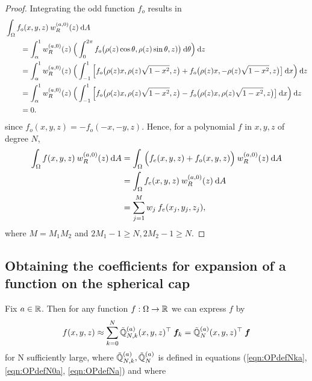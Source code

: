 \documentclass[11pt, oneside]{article}   	%
\begin{document}
\begin{proof}
Integrating the odd function $f_o$ results in
\begin{align*}
	&\int_\Omega f_o(x,y,z) \: w_R^{(a,0)}(z) \: {\rm d} A \\
	&\quad \quad = \int_\alpha^1 w_R^{(a,0)}(z) \: \Big( \int_0^{2\pi} f_o\big(\rho(z)\cos\theta,\rho(z)\sin\theta, z)\big) \: {\rm d} \theta \Big) \: {\rm d} z \\
	&\quad \quad = \int_\alpha^1 w_R^{(a,0)}(z) \: \Big( \int_{-1}^1 \Big[ f_o\big(\rho(z)x,\rho(z)\sqrt{1-x^2}, z\big) + f_o\big(\rho(z)x, - \rho(z)\sqrt{1-x^2}, z\big) \big] \: {\rm d} x \Big) \: {\rm d} z \\
	&\quad \quad = \int_\alpha^1 w_R^{(a,0)}(z) \: \Big( \int_{-1}^1 \Big[ f_o\big(\rho(z)x,\rho(z)\sqrt{1-x^2}, z\big) - f_o\big(\rho(z)x, \rho(z)\sqrt{1-x^2}, z\big) \big] \: {\rm d} x \Big) \: {\rm d} z \\
	&\quad \quad = 0.
\end{align*}
since $f_o(x,y,z) = - f_o(-x, -y, z)$. Hence, for a polynomial $f$ in $x,y,z$ of degree $N$,
\begin{align*}
	\int_\Omega f(x,y,z) \: w_R^{(a,0)}(z) \: {\rm d} A &= \int_\Omega \Big(f_e(x,y,z) + f_o(x,y,z)\Big) \:  w_R^{(a,0)}(z) \: {\rm d} A  \\
	&= \int_\Omega f_e(x,y,z) \: w_R^{(a,0)}(z) \: {\rm d} A \\
	&= \sum_{j=1}^{M}  w_j \: f_e(x_j, y_j, z_j),
\end{align*}
where $M = M_1 M_2$ and $2M_1 - 1 \ge N, 2M_2 - 1 \ge N$.
\end{proof}


\subsection{Obtaining the coefficients for expansion of a function on the spherical cap}\label{subsection:expandingfunctions}

Fix $a \in \mathbb{R}$. Then for any function $f : \Omega \to \mathbb{R}$ we can express $f$ by
\begin{align*}
	f(x,y,z) \approx \sum_{k=0}^N {\mathbb{\tilde Q}}^{(a)}_{N,k}(x,y,z)^\top \: \bm{f}_k = {\mathbb{\tilde Q}}^{(a)}_{N}(x,y,z)^\top \: \bm{f}
\end{align*}
for N sufficiently large, where ${\mathbb{\tilde Q}}^{(a)}_{N,k}, {\mathbb{\tilde Q}}^{(a)}_{N}$ is defined in equations (\ref{eqn:OPdefNka}, \ref{eqn:OPdefN0a}, \ref{eqn:OPdefNa}) and where
\end{document}
